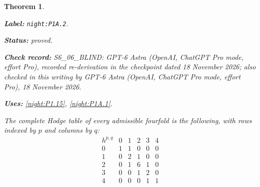 \documentclass[11pt,a4paper]{article}
\newtheorem{theorem}{Theorem}[section]
\theoremstyle{definition}
\newcommand{\StatementRecord}[4]{\par\smallskip\begingroup\upshape\raggedright\noindent\textbf{Label:} \nolinkurl{#1}.\par\noindent\textbf{Status:} #2.\par\noindent\textbf{Check record:} #3.\par\noindent\textbf{Uses:} #4.\par\endgroup\smallskip}
\newcommand{\CurrentChecker}{GPT-6 Astra (OpenAI, ChatGPT Pro mode, effort Pro), 18 November 2026}
\begin{document}
\begin{theorem}\label{night:P1A.2}
\StatementRecord{night:P1A.2}{proved}{S6\_06\_BLIND: GPT-6 Astra (OpenAI, ChatGPT Pro mode, effort Pro), recorded re-derivation in the checkpoint dated 18 November 2026; also checked in this writing by \CurrentChecker}{\cref{night:P1.15}, \cref{night:P1A.1}}
The complete Hodge table of every admissible fourfold is the
following, with rows indexed by $p$ and columns by $q$:
\[
\begin{array}{c|ccccc}
h^{p,q}&0&1&2&3&4\\\hline
0&1&1&0&0&0\\
1&0&2&1&0&0\\
2&0&1&6&1&0\\
3&0&0&1&2&0\\
4&0&0&0&1&1
\end{array}
\]
\end{theorem}
\end{document}
